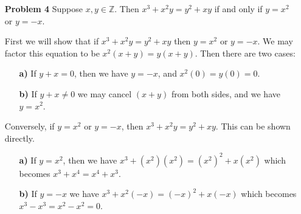 \documentclass[12pt, oneside]{article}
\newcommand{\Integers}{\mathbb{Z}}
\begin{document}
\begin{itemize}
    \item[\textbf{Problem 4}] Suppose \(x, y \in \Integers\). Then \(x^3 + x^2y = y^2 +xy\) if and only if \(y = x^2\) or \(y = -x\).


          First we will show that if \(x^3 + x^2y = y^2 +xy\) then \(y = x^2\) or \(y = -x\). We may factor this equation to be \(x^2(x+y) = y(x+y)\). Then there are two cases:

          \begin{itemize}
              \item[\textbf{a)}] If \(y+x = 0\), then we have \(y = -x\), and \(x^2(0) = y(0) = 0\).
              \item[\textbf{b)}] If \(y+x \neq 0\) we may cancel \((x+y)\) from both sides, and we have \(y = x^2\).
          \end{itemize}

          Conversely, if \(y = x^2\) or \(y = -x\), then \(x^3 + x^2y = y^2 +xy\). This can be shown directly.
          \begin{itemize}
              \item[\textbf{a)}] If \(y = x^2\), then we have \(x^3 + (x^2)(x^2) = (x^2)^2 +x(x^2)\) which becomes \(x^3 + x^4 = x^4 + x^3\).

              \item[\textbf{b)}] If \(y = -x\) we have \(x^3 + x^2(-x) = (-x)^2 + x(-x)\) which becomes \(x^3 - x^3 = x^2 - x^2 = 0\).
          \end{itemize}


\end{itemize}
\end{document}
